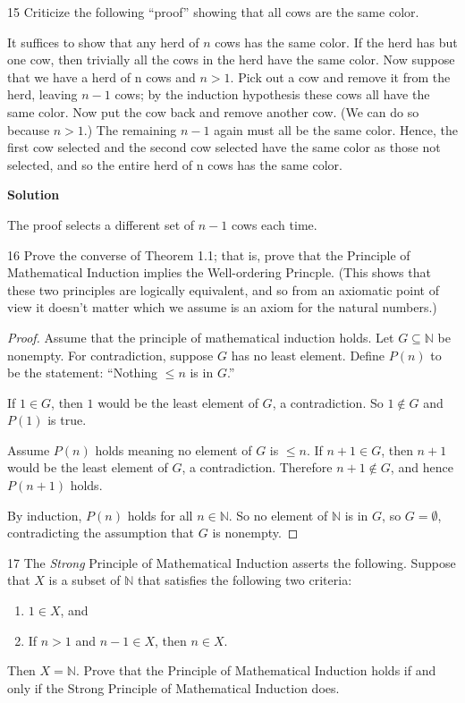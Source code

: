 \begin{problem}{15}
    Criticize the following ``proof'' showing that all cows are the same
    color.

    It suffices to show that any herd of $n$ cows has the same color. If the herd
    has but one cow, then trivially all the cows in the herd have the same color.
    Now suppose that we have a herd of n cows and $n > 1$. Pick out a cow and
    remove it from the herd, leaving $n - 1$ cows; by the induction hypothesis
    these cows all have the same color. Now put the cow back and remove another
    cow. (We can do so because $n > 1$.) The remaining $n - 1$ again must all be
    the same color. Hence, the first cow selected and the second cow selected have
    the same color as those not selected, and so the entire herd of n cows has the
    same color.
\end{problem}
\solved

\textbf{Solution}

The proof selects a different set of $n - 1$ cows each time.

\begin{problem}{16}
    Prove the converse of Theorem 1.1; that is, prove that the Principle 
    of Mathematical Induction implies the Well-ordering Princple. 
    (This shows that these two principles are logically equivalent,
    and so from an axiomatic point of view it doesn't matter which
    we assume is an axiom for the natural numbers.)
\end{problem}
\solved

\begin{proof}
    Assume that the principle of mathematical induction holds.
    Let $G \subseteq \mathbb{N}$ be nonempty. For contradiction, suppose $G$ has no least element. 
    Define $P(n)$ to be the statement: ``Nothing $\le n$ is in $G$.''

    If $1 \in G$, then $1$ would be the least element of $G$, a contradiction. So
    $1 \notin G$ and $P(1)$ is true.

    Assume $P(n)$ holds meaning no element of $G$ is $\le n$. If $n+1 \in G$, then
    $n+1$ would be the least element of $G$, a contradiction. Therefore $n+1 \notin
        G$, and hence $P(n+1)$ holds.

    By induction, $P(n)$ holds for all $n \in \mathbb{N}$. So no element of
    $\mathbb{N}$ is in $G$, so $G = \emptyset$, contradicting the assumption that
    $G$ is nonempty. 
\end{proof}

\begin{problem}{17}
    The \emph{Strong} Principle of Mathematical Induction asserts the following.
    Suppose that $X$ is a subset of $\mathbb{N}$ that satisfies the following two criteria:
    \begin{enumerate}
        \item[(a)] $1 \in X$, and
        \item[(b)] If $n > 1$ and $n - 1 \in X$, then $n \in X$.
    \end{enumerate}
    Then $X = \mathbb{N}$. Prove that the Principle of Mathematical Induction holds
    if and only if the Strong Principle of Mathematical Induction does.
\end{problem}
\unsolved
